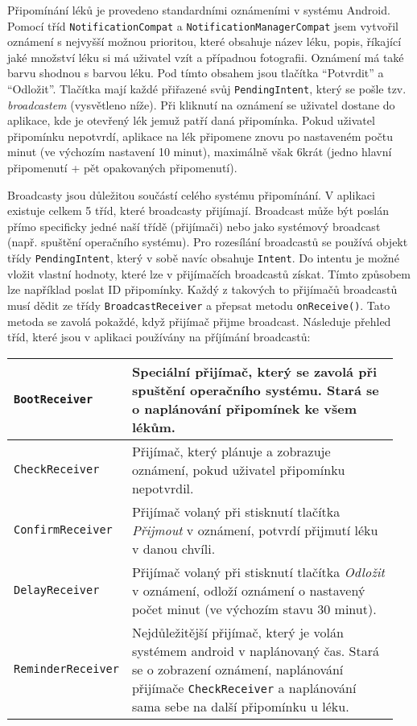 \documentclass[../TakeYourPill.tex]{subfiles}
\begin{document}
Připomínání léků je provedeno standardními oznámeními v systému Android. Pomocí tříd \texttt{NotificationCompat} a \texttt{NotificationManagerCompat} jsem vytvořil oznámení s nejvyšší možnou prioritou, které obsahuje název léku, popis, říkající jaké množství léku si má uživatel vzít a případnou fotografii. Oznámení má také barvu shodnou s barvou léku. Pod tímto obsahem jsou tlačítka \enquote{Potvrdit} a \enquote{Odložit}. Tlačítka mají každé přiřazené svůj \texttt{PendingIntent}, který se pošle tzv. \textit{broadcastem} (vysvětleno níže). Při kliknutí na oznámení se uživatel dostane do aplikace, kde je otevřený lék jemuž patří daná připomínka. Pokud uživatel připomínku nepotvrdí, aplikace na lék připomene znovu po nastaveném počtu minut (ve výchozím nastavení 10 minut), maximálně však 6krát (jedno hlavní připomenutí + pět opakovaných připomenutí).


Broadcasty jsou důležitou součástí celého systému připomínání. V aplikaci existuje celkem 5 tříd, které broadcasty přijímají. Broadcast může být poslán přímo specificky jedné naší třídě (přijímači) nebo jako systémový broadcast (např. spuštění operačního systému). Pro rozesílání broadcastů se používá objekt třídy \texttt{PendingIntent}, který v sobě navíc obsahuje \texttt{Intent}. Do intentu je možné vložit vlastní hodnoty, které lze v přijímačích broadcastů získat. Tímto způsobem lze například poslat ID připomínky. Každý z takových to přijímačů broadcastů musí dědit ze třídy \texttt{BroadcastReceiver} a přepsat metodu \texttt{onReceive()}. Tato metoda se zavolá pokaždé, když přijímač přijme broadcast. Následuje přehled tříd, které jsou v aplikaci používány na příjímání broadcastů:


\begin{tabular}{ |p{0.25\linewidth} | p{0.70\linewidth}| }
  \hline
  \texttt{BootReceiver} & Speciální přijímač, který se zavolá při spuštění operačního systému. Stará se o naplánování připomínek ke všem lékům.\\
  \hline
  \texttt{CheckReceiver} & Přijímač, který plánuje a zobrazuje oznámení, pokud uživatel připomínku nepotvrdil. \\
  \hline
  \texttt{ConfirmReceiver} & Přijímač volaný při stisknutí tlačítka \textit{Přijmout} v oznámení, potvrdí přijmutí léku v danou chvíli. \\
  \hline
  \texttt{DelayReceiver} & Přijímač volaný při stisknutí tlačítka \textit{Odložit} v oznámení, odloží oznámení o nastavený počet minut (ve výchozím stavu 30 minut). \\
  \hline
  \texttt{ReminderReceiver} & Nejdůležitější přijímač, který je volán systémem android v naplánovaný čas. Stará se o zobrazení oznámení, naplánování přijímače \texttt{CheckReceiver} a naplánování sama sebe na další připomínku u léku. \\
  \hline
\end{tabular}
\end{document}
